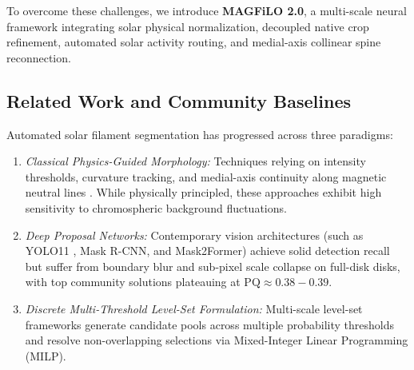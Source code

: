 \documentclass[conference]{IEEEtran}
\begin{document}
To overcome these challenges, we introduce \textbf{MAGFiLO 2.0}, a multi-scale neural framework integrating solar physical normalization, decoupled native crop refinement, automated solar activity routing, and medial-axis collinear spine reconnection.

\subsection{Related Work and Community Baselines}
Automated solar filament segmentation has progressed across three paradigms:
\begin{enumerate}
    \item \textit{Classical Physics-Guided Morphology:} Techniques relying on intensity thresholds, curvature tracking, and medial-axis continuity along magnetic neutral lines \cite{bernasconi2005}. While physically principled, these approaches exhibit high sensitivity to chromospheric background fluctuations.
    \item \textit{Deep Proposal Networks:} Contemporary vision architectures (such as YOLO11 \cite{glenn2024yolo11}, Mask R-CNN, and Mask2Former) achieve solid detection recall but suffer from boundary blur and sub-pixel scale collapse on full-disk disks, with top community solutions plateauing at $\text{PQ} \approx 0.38 - 0.39$.
    \item \textit{Discrete Multi-Threshold Level-Set Formulation:} Multi-scale level-set frameworks generate candidate pools across multiple probability thresholds and resolve non-overlapping selections via Mixed-Integer Linear Programming (MILP).
\end{enumerate}
\end{document}
